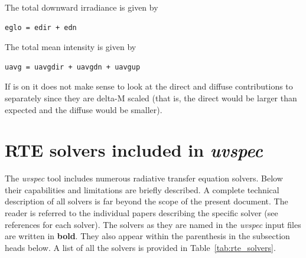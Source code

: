 \noindent The total downward irradiance is given by

\begin{Verbatim}[fontsize=\footnotesize]
  eglo = edir + edn
\end{Verbatim}

\noindent The total mean intensity is given by

\begin{Verbatim}[fontsize=\footnotesize]  
  uavg = uavgdir + uavgdn + uavgup
\end{Verbatim}

\noindent If  is on it does not make sense to look at the
direct and diffuse contributions to  separately since they
are delta-M scaled (that is, the direct would be larger than expected
and the diffuse would be smaller).

\section{RTE solvers included in  {\sl uvspec}}
\label{sec:RTEsolvers}

The {\sl uvspec} tool includes numerous radiative transfer equation
solvers. Below their capabilities and limitations are briefly
described. A complete technical description of all solvers is far
beyond the scope of the present document. The reader is referred to
the individual papers describing the specific solver (see references
for each solver). The solvers as they are named in the {\sl uvspec}
input files are written in {\bf bold}. They also appear within the
parenthesis in the subsection heads below. A list of all the solvers is
provided in Table~\ref{tab:rte_solvers}. 

